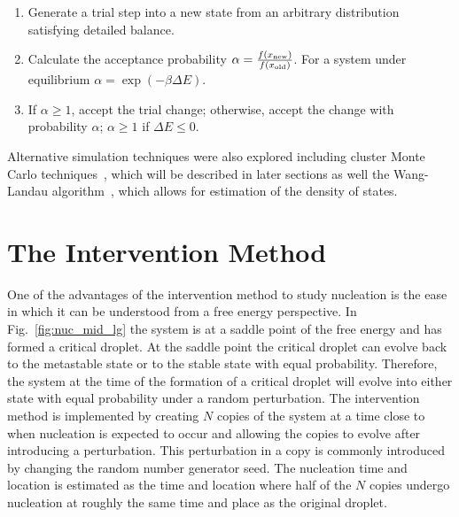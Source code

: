 \begin{enumerate}
	\item Generate a trial step into a new state from an arbitrary distribution satisfying detailed balance.
	\item Calculate the acceptance probability $\alpha = \frac{f(x_{\rm new})}{f(x_{\rm old})}$. For a system under equilibrium $\alpha = \exp{(-\beta \Delta E )}$.
	
	\item If $\alpha \geq 1$, accept the trial change; otherwise, accept the change with probability $\alpha$; $\alpha \geq 1$ if $\Delta E \leq 0 $.
\end{enumerate} %
Alternative simulation techniques were also explored including cluster Monte Carlo techniques~\cite{wolff89}, which will be described in later sections as well the Wang-Landau algorithm~\cite{wang01}, which allows for estimation of the density of states.
 
\section{The Intervention Method}
One of the advantages of the intervention method to study nucleation is the ease in which it can be understood from a free energy perspective. In Fig.~\ref{fig:nuc_mid_lg} the system is at a saddle point of the free energy and has formed a critical droplet. At the saddle point the critical droplet can evolve back to the metastable state or to the stable state with equal probability. Therefore, the system at the time of the formation of a critical droplet will evolve into either state with equal probability under a random perturbation. The intervention method is implemented by creating $N$ copies of the system at a time close to when nucleation is expected to occur and allowing the copies to evolve after introducing a perturbation. This perturbation in a copy is commonly introduced by changing the random number generator seed. The nucleation time and location is estimated as the time and location where half of the $N$ copies undergo nucleation at roughly the same time and place as the original droplet.

